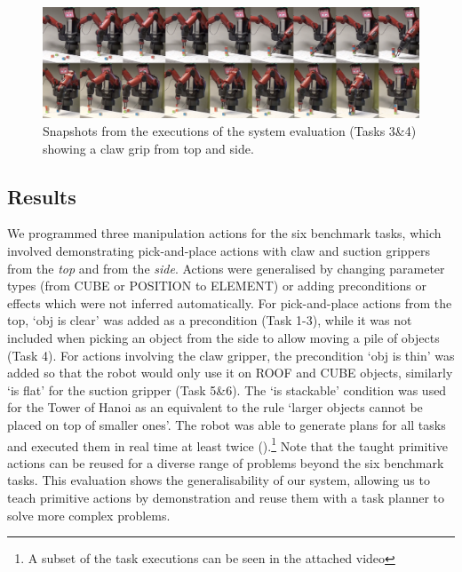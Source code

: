 \begin{figure}[h]
	\centering
	\includegraphics[width=\linewidth]{figures/filmstrip.png}
	\caption{Snapshots from the executions of the system evaluation (Tasks 3\&4) showing a claw grip from top and side.}
	\label{fig:filmstrip}
\end{figure}

\subsection{Results}
We programmed three manipulation actions for the six benchmark tasks, which involved demonstrating pick-and-place actions with claw and suction grippers from the \textit{top} and from the \textit{side}.
Actions were generalised by changing parameter types (\eg from CUBE or POSITION to ELEMENT) or adding preconditions or effects which were not inferred automatically.
For pick-and-place actions from the top, `obj is clear' was added as a precondition (Task 1-3), while it was not included when picking an object from the side to allow moving a pile of objects (Task 4).
For actions involving the claw gripper, the precondition `obj is thin' was added so that the robot would only use it on ROOF and CUBE objects, similarly `is flat' for the suction gripper (Task 5\&6).
The `is stackable' condition was used for the Tower of Hanoi as an equivalent to the rule `larger objects cannot be placed on top of smaller ones'.
The robot was able to generate plans for all tasks and executed them in real time at least twice ().\footnote{A subset of the task executions can be seen in the attached video}
Note that the taught primitive actions can be reused for a diverse range of problems beyond the six benchmark tasks.
This evaluation shows the generalisability of our system, allowing us to teach primitive actions by demonstration and reuse them with a task planner to solve more complex problems.
